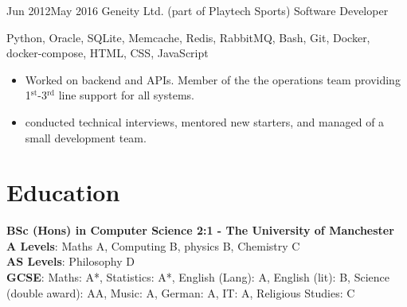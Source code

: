 \documentclass[10pt]{article} %
\begin{document}
\jobheader
{Jun 2012}{May 2016}
{Geneity Ltd. (part of Playtech Sports)}
{Software Developer}
{
      Python,
      Oracle, SQLite,
      Memcache, Redis,
      RabbitMQ,
      Bash,
      Git,
      Docker, docker-compose,
      HTML, CSS, JavaScript
    
}
{
      \begin{itemize}

      \item Worked on backend and APIs. Member of the the operations team providing
            1$^{\textrm{st}}$-3$^{\textrm{rd}}$ line support for all systems.

      \item conducted technical interviews, mentored new starters, and managed of a small
            development team. 

      \end{itemize}
}


\section{Education}

\textbf{BSc (Hons) in Computer Science 2:1 - The University of Manchester}
\\
\textbf{A Levels}: Maths A, Computing B, physics B, Chemistry C
\\
\textbf{AS Levels}: Philosophy D
\\
\textbf{GCSE}:
   Maths: A*,
   Statistics: A*,
   English (Lang): A,
   English (lit): B,
   Science (double award): AA,
   Music: A,
   German: A,
   IT: A,
   Religious Studies: C



\end{document}
